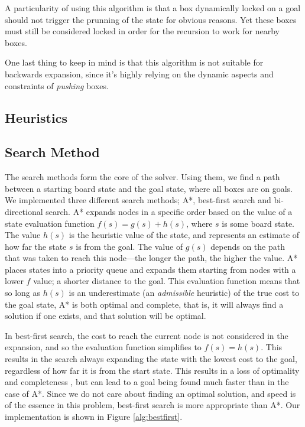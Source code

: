 \documentclass[a4paper,11pt]{article}
\begin{document}
A particularity of using this algorithm is that a box dynamically
locked on a goal should not trigger the prunning of the state for
obvious reasons. Yet these boxes must still be considered locked in
order for the recursion to work for nearby boxes.

One last thing to keep in mind is that this
algorithm is not suitable for backwards expansion, since it's highly
relying on the dynamic aspects and constraints of \emph{pushing}
boxes.


\subsection{Heuristics}

\subsection{Search Method}
The search methods form the core of the solver. Using them, we find a path
between a starting board state and the goal state, where all boxes are on
goals. We implemented three different search methods; A*, best-first search and
bi-directional search. A* expands nodes in a specific order based on the value
of a state evaluation function $f(s)=g(s)+h(s)$, where $s$ is some board
state. The value $h(s)$ is the heuristic value of the state, and represents an
estimate of how far the state $s$ is from the goal. The value of $g(s)$ depends
on the path that was taken to reach this node---the longer the path, the higher
the value. A* places states into a priority queue and expands them starting from
nodes with a lower $f$ value; a shorter distance to the goal. This evaluation
function means that so long as $h(s)$ is an underestimate (an \emph{admissible}
heuristic) of the true cost to the goal state, A* is both optimal and complete,
that is, it will always find a solution if one exists, and that solution will be
optimal\cite{aima}.

In best-first search, the cost to reach the current node is not considered in
the expansion, and so the evaluation function simplifies to $f(s)=h(s)$. This
results in the search always expanding the state with the lowest cost to the
goal, regardless of how far it is from the start state. This results in a loss
of optimality and completeness \cite{aima}, but can lead to a goal being found
much faster than in the case of A*. Since we do not care about finding an
optimal solution, and speed is of the essence in this problem, best-first search
is more appropriate than A*. Our implementation is shown in Figure
\ref{alg:bestfirst}.
\end{document}
